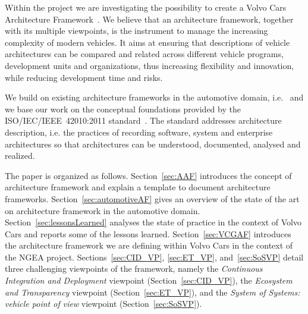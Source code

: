 \documentclass[preprint,12pt,3p]{elsarticle}
\begin{document}
Within the project we are investigating the possibility to create a Volvo Cars Architecture Framework~\cite{42010}. %
We believe that an architecture framework, together with its multiple viewpoints, is the instrument to manage the increasing complexity of modern vehicles.
It aims at ensuring that descriptions of vehicle architectures can be compared and related across different vehicle programs,
development units and organizations, thus increasing flexibility and innovation, while reducing development time and risks.

We build on existing architecture frameworks in the automotive domain, i.e.~\cite{Broy,Yania} and we base our work on the conceptual foundations provided by the ISO/IEC/IEEE~42010:2011 standard~\cite{42010}.   
The standard 
 addresses architecture description, i.e. the practices of recording software, system
and enterprise architectures so that architectures can be understood,
documented, analysed and realized. 

The paper is organized as follows. Section~\ref{sec:AAF} introduces the concept of architecture framework and explain a template to document architecture frameworks. Section~\ref{sec:automotiveAF} gives an overview of 
 the state of the art on architecture framework in the automotive domain. Section~\ref{sec:lessonsLearned} analyses the state of practice in the context of Volvo Cars and reports some of the lessons learned. Section~\ref{sec:VCGAF} introduces the architecture framework we are defining within Volvo Cars in the context of the NGEA project. Sections~\ref{sec:CID_VP}, \ref{sec:ET_VP}, and~\ref{sec:SoSVP} detail three challenging viewpoints of the framework, namely the {\em Continuous Integration and Deployment} viewpoint (Section~\ref{sec:CID_VP}), the {\em Ecosystem and Transparency} viewpoint (Section~\ref{sec:ET_VP}), and the {\em System of Systems: vehicle point of view} viewpoint (Section~\ref{sec:SoSVP}).
 
\end{document}
